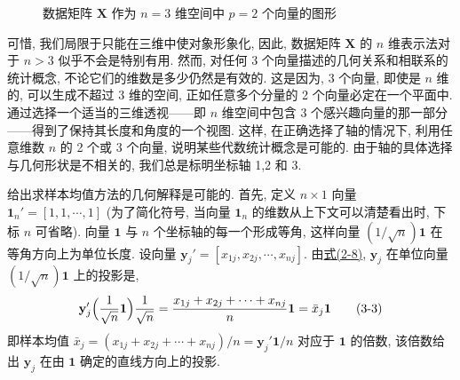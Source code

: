 \begin{figure}[H]
\centering
{}
\caption{数据矩阵 $\mathbf{X}$ 作为 $n=3$ 维空间中 $p=2$ 个向量的图形}
\end{figure}

可惜, 我们局限于只能在三维中使对象形象化, 因此, 数据矩阵 $\mathbf{X}$ 的 $n$ 维表示法对于 $n>3$ 似乎不会是特别有用. 然而, 对任何 3 个向量描述的几何关系和相联系的统计概念, 不论它们的维数是多少仍然是有效的. 这是因为, 3 个向量, 即使是 $n$ 维的, 可以生成不超过 3 维的空间, 正如任意多个分量的 2 个向量必定在一个平面中. 通过选择一个适当的三维透视——即 $n$ 维空间中包含 3 个感兴趣向量的那一部分——得到了保持其长度和角度的一个视图. 这样, 在正确选择了轴的情况下, 利用任意维数 $n$ 的 2 个或 3 个向量, 说明某些代数统计概念是可能的. 由于轴的具体选择与几何形状是不相关的, 我们总是标明坐标轴 1,2 和 3.

给出求样本均值方法的几何解释是可能的. 首先, 定义 $n\times1$ 向量 $\mathbf{1}_{n}'=[1,1,\cdots,1]$ (为了简化符号, 当向量 $\mathbf{1}_{n}$ 的维数从上下文可以清楚看出时, 下标 $n$ 可省略). 向量 $\mathbf{1}$ 与 $n$ 个坐标轴的每一个形成等角, 这样向量 $(1/\sqrt{n})\mathbf{1}$ 在等角方向上为单位长度. 设向量 $\mathbf{y}_{j}'=[x_{1j},x_{2j},\cdots,x_{nj}]$. 由\hyperref[eq:2-8]{式(2-8)}, $\mathbf{y}_{j}$ 在单位向量 $(1/\sqrt{n})\mathbf{1}$ 上的投影是,
\label{eq:3-3}
\begin{equation}
\mathbf{y}_{j}'\Bigl(\frac{1}{\sqrt{n}}\mathbf{1}\Bigr)\frac{1}{\sqrt{n}}=\frac{x_{1j}+x_{2j}+\cdots+x_{nj}}{n}\mathbf{1}=\bar{x}_{j}\mathbf{1}
\tag{3-3}
\end{equation}
即样本均值 $\bar{x}_{j}=(x_{1j}+x_{2j}+\cdots+x_{nj})/n=\mathbf{y}_{j}'\mathbf{1}/n$ 对应于 $\mathbf{1}$ 的倍数, 该倍数给出 $\mathbf{y}_{j}$ 在由 $\mathbf{1}$ 确定的直线方向上的投影.

